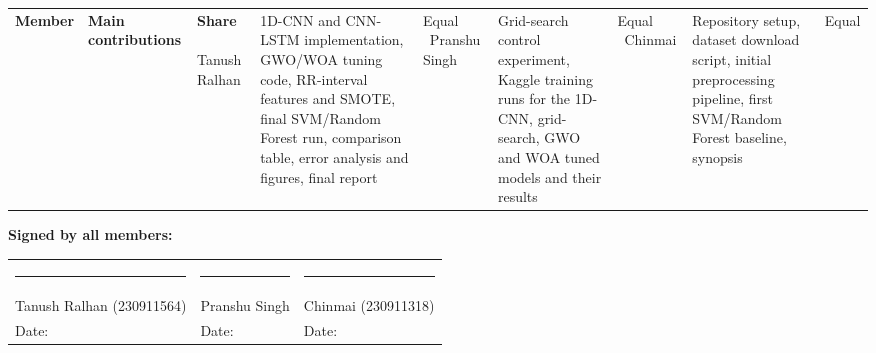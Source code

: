 \documentclass[11pt,a4paper]{article}
\begin{document}
\begin{table}[H]
\centering\small
\begin{tabular}{p{3.2cm}p{10.3cm}p{1.8cm}}
\toprule
\textbf{Member} & \textbf{Main contributions} & \textbf{Share} \
\midrule
Tanush Ralhan & 1D-CNN and CNN-LSTM implementation, GWO/WOA tuning code, RR-interval features and SMOTE, final SVM/Random Forest run, comparison table, error analysis and figures, final report & Equal \
Pranshu Singh & Grid-search control experiment, Kaggle training runs for the 1D-CNN, grid-search, GWO and WOA tuned models and their results & Equal \
Chinmai & Repository setup, dataset download script, initial preprocessing pipeline, first SVM/Random Forest baseline, synopsis & Equal \
\bottomrule
\end{tabular}
\end{table}

\vspace{0.8cm}
\noindent\textbf{Signed by all members:}\\[1.2cm]
\begin{tabular}{p{5cm}p{5cm}p{5cm}}
\rule{4.5cm}{0.4pt} & \rule{4.5cm}{0.4pt} & \rule{4.5cm}{0.4pt} \\
Tanush Ralhan (230911564) & Pranshu Singh & Chinmai (230911318) \\
Date: & Date: & Date: \\
\end{tabular}
\end{document}
